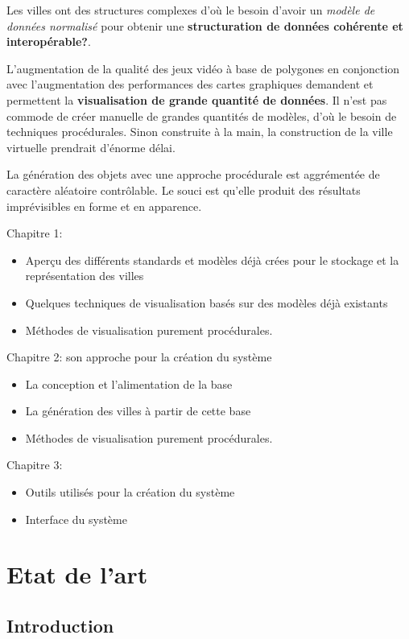 \documentclass[11pt]{report}
\begin{document}
Les villes ont des structures complexes d'où le besoin d'avoir un \textit{modèle de données normalisé} pour obtenir une \textbf{structuration de données cohérente et interopérable?}.

L'augmentation de la qualité des jeux vidéo à base de polygones en conjonction avec l'augmentation des performances des cartes graphiques demandent et permettent la \textbf{visualisation de grande quantité de données}. Il n'est pas commode de créer manuelle de grandes quantités de modèles, d'où le besoin de techniques procédurales. 
Sinon construite à la main, la construction de la ville virtuelle prendrait d'énorme délai.

La génération des objets avec une approche procédurale est aggrémentée de caractère aléatoire contrôlable.
Le souci est qu'elle produit des résultats imprévisibles en forme et en apparence.

Chapitre 1: 
\begin{itemize}
\item Aperçu des différents standards et modèles déjà crées pour le stockage et la représentation des villes
\item Quelques techniques de visualisation basés sur des modèles déjà existants
\item Méthodes de visualisation purement procédurales.
\end{itemize}

Chapitre 2: son approche pour la création du système
\begin{itemize}
\item La conception et l’alimentation de la base
\item La génération des villes à partir de cette base
\item Méthodes de visualisation purement procédurales.
\end{itemize}

Chapitre 3:
\begin{itemize}
\item Outils utilisés pour la création du système
\item Interface du système
\end{itemize}

\chapter{Etat de l'art}

\section{Introduction}
\end{document}
